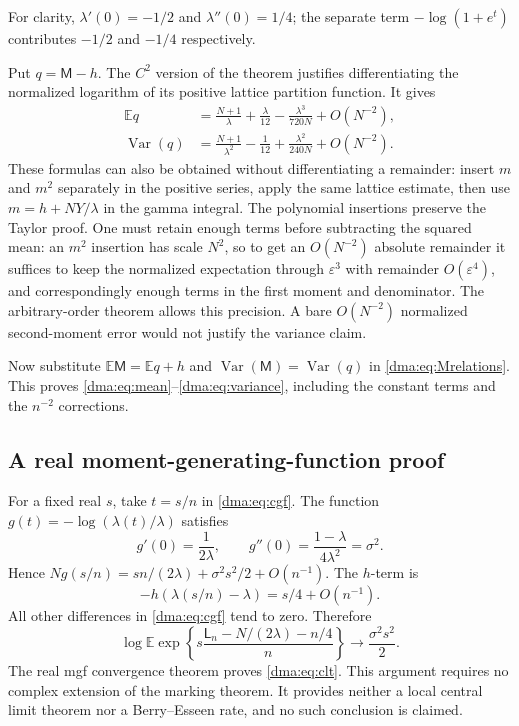 \documentclass[11pt,letterpaper]{article}
\theoremstyle{remark}\newtheorem{remark}[theorem]{Remark}
\newcommand{\E}{\mathbb E}
\newcommand{\Var}{\operatorname{Var}}
\begin{document}
For clarity, $\lambda'(0)=-1/2$ and $\lambda''(0)=1/4$; the separate term $-\log(1+e^t)$ contributes $-1/2$ and $-1/4$ respectively.

Put $q=\mathsf M-h$. The $C^2$ version of the theorem justifies differentiating the normalized logarithm of its positive lattice partition function. It gives
\begin{align}
 \E q&=\frac{N+1}{\lambda}+\frac\lambda{12}
 -\frac{\lambda^3}{720N}+O(N^{-2}),\label{dma:eq:qmean}\\
 \Var(q)&=\frac{N+1}{\lambda^2}-\frac1{12}
 +\frac{\lambda^2}{240N}+O(N^{-2}).\label{dma:eq:qvar}
\end{align}
These formulas can also be obtained without differentiating a remainder: insert $m$ and $m^2$ separately in the positive series, apply the same lattice estimate, then use $m=h+NY/\lambda$ in the gamma integral. The polynomial insertions preserve the Taylor proof. One must retain enough terms before subtracting the squared mean: an $m^2$ insertion has scale $N^2$, so to get an $O(N^{-2})$ absolute remainder it suffices to keep the normalized expectation through $\varepsilon^3$ with remainder $O(\varepsilon^4)$, and correspondingly enough terms in the first moment and denominator. The arbitrary-order theorem allows this precision. A bare $O(N^{-2})$ normalized second-moment error would not justify the variance claim.

Now substitute $\E\mathsf M=\E q+h$ and $\Var(\mathsf M)=\Var(q)$ in \eqref{dma:eq:Mrelations}. This proves \eqref{dma:eq:mean}--\eqref{dma:eq:variance}, including the constant terms and the $n^{-2}$ corrections.

\subsection{A real moment-generating-function proof}
For a fixed real $s$, take $t=s/n$ in \eqref{dma:eq:cgf}. The function
$g(t)=-\log(\lambda(t)/\lambda)$ satisfies
\[
 g'(0)=\frac1{2\lambda},\qquad
 g''(0)=\frac{1-\lambda}{4\lambda^2}=\sigma^2.
\]
Hence $Ng(s/n)=sn/(2\lambda)+\sigma^2s^2/2+O(n^{-1})$. The $h$-term is
\[
 -h(\lambda(s/n)-\lambda)=s/4+O(n^{-1}).
\]
All other differences in \eqref{dma:eq:cgf} tend to zero. Therefore
\[
 \log\E\exp\left\{s\frac{\mathsf L_n-N/(2\lambda)-n/4}{n}\right\}
 \longrightarrow\frac{\sigma^2s^2}{2}.
\]
The real mgf convergence theorem proves \eqref{dma:eq:clt}. This argument requires no complex extension of the marking theorem. It provides neither a local central limit theorem nor a Berry--Esseen rate, and no such conclusion is claimed.
\end{document}
